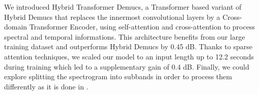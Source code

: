 \documentclass{article}
\newcommand{\source}[1]{\texttt{#1}}
\newcommand{\alex}[1]{{\color{blue} A: #1}}
\newcommand{\simon}[1]{{\color{red} S: #1}}
\begin{document}
We introduced Hybrid Transformer Demucs, a Transformer based variant of Hybrid Demucs that replaces the innermost convolutional layers by a Cross-domain Transformer Encoder, using self-attention and cross-attention to process spectral and temporal informations. This architecture benefits from our large training dataset and outperforms Hybrid Demucs by 0.45 dB. Thanks to sparse attention techniques, we scaled our model to an input length up to 12.2 seconds during training which led to a supplementary gain of 0.4 dB. 
 Finally, we could explore splitting the spectrogram into subbands in order to process them differently as it is done in \cite{bsrnn}. 








\begin{comment}
\begin{table}
\caption{Study of duration, Transformer depth and Transformer dimension \alex{change all results to BS=32 only!! and add poulain 955717e8, and add as OOM 955717e8 + depth=7 + segment =12.2} \simon{est-ce qu'on rajouterait pas les real time factor CPU dans les tableaux ?}}
\label{tab:preliminary}
\begin{center}
\resizebox{0.4\textwidth}{!}{
\begin{tabular}{c c c c}
  \toprule
  \textbf{duration} & \textbf{depth} & \textbf{dimension} &
  \source{Test SDR (All)} \\
  \midrule
  7.8 & 5 & 384 & 8.51 \\
  \midrule
  3.4 & 5 & 384 & 7.76 \\
  12.2 & 5 & 384 & 8.56 \\
  7.8 & 7 & 384 & 8.68 \\
  7.8 & 5 & 512 & 7.68  \\
  \midrule
  12.2 & 5 & 512 & 8.69 \\
  12.2 & 7 & 384 & Out of Memory \\

  \bottomrule
\end{tabular}}
\end{center}
\end{table}
\end{comment}
\end{document}
